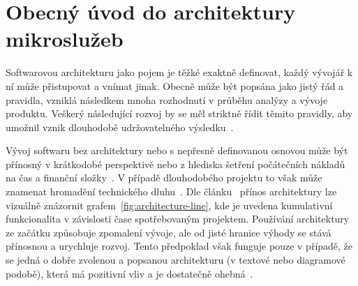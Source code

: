 \chapter{Obecný úvod do architektury mikroslužeb}\label{ch:msa-intro}



Softwarovou architekturu jako pojem je těžké exaktně definovat, každý vývojář k ní může přistupovat a vnímat jinak.
Obecně může být popsána jako jistý řád a pravidla, vzniklá následkem mnoha rozhodnutí v průběhu analýzy a vývoje produktu.
Veškerý následující rozvoj by se měl striktně řídit těmito pravidly, aby umožnil vznik dlouhodobě udržovatelného výsledku~\cite{softarch}.

Vývoj softwaru bez architektury nebo s nepřesně definovanou osnovou může být přínosný v krátkodobé perspektivě nebo z hlediska šetření počátečních nákladů na čas a finanční složky~\cite{softarch}.
V případě dlouhodobého projektu to však může znamenat hromadění technického dluhu~\cite{archoworthit}.
Dle článku~\cite{archoworthit} přínos architektury lze vizuálně znázornit grafem~\ref{fig:architecture-line}, kde je uvedena kumulativní funkcionalita v závislosti čase spotřebovaným projektem.
Používání architektury ze začátku způsobuje zpomalení vývoje, ale od jisté hranice výhody se stává přínosnou a urychluje rozvoj.
Tento předpoklad však funguje pouze v případě, že se jedná o dobře zvolenou a popsanou architekturu (v textové nebo diagramové podobě), která má pozitivní vliv a je dostatečně ohebná~\cite{archoworthit}.


